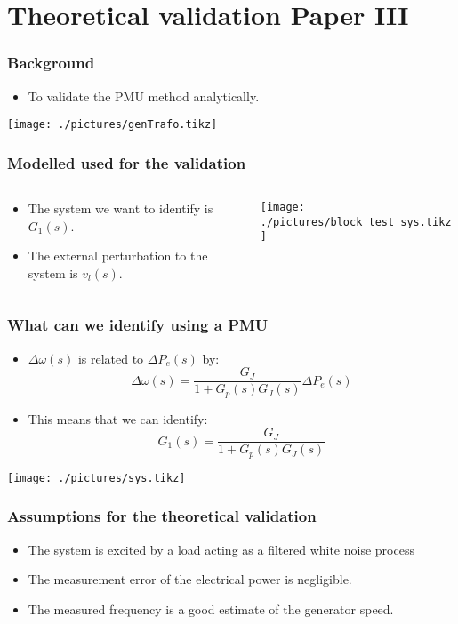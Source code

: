 \section{Theoretical validation Paper III}
\begin{frame}
	\frametitle{Background}
	\begin{itemize}
		\item To validate the PMU method analytically.
	\end{itemize}
	\texttt{[image: ./pictures/genTrafo.tikz]}
\end{frame}
\begin{frame}
	\frametitle{Modelled used for the validation}
	\begin{columns}
		\begin{column}{0.3\textwidth}
			\begin{itemize}
				\item The system we want to identify is $G_1(s)$.
				\item The external perturbation to the system is $v_l(s)$.
			\end{itemize}
		\end{column}
		\begin{column}{0.7\textwidth}
			\texttt{[image: ./pictures/block\_test\_sys.tikz]}
		\end{column}
	\end{columns}
\end{frame}
\begin{frame}
	\frametitle{What can we identify using a PMU}
	\begin{itemize}
		\item $\Delta \omega(s)$ is related to $\Delta P_e(s)$ by:
	\begin{equation*}
		\Delta \omega(s) = \frac{G_{J}}{1+G_p(s)G_J(s)}\Delta P_e(s)
	\end{equation*}
	\item This means that we can identify:
		\begin{equation*}
			G_1(s) = \frac{G_{J}}{1+G_p(s)G_J(s)}
		\end{equation*}
	\end{itemize}
		\texttt{[image: ./pictures/sys.tikz]}
\end{frame}
\begin{frame}
	\frametitle{Assumptions for the theoretical validation}
		\begin{itemize}
			\item The system is excited by a load acting as a filtered white noise process
			\item The measurement error of the electrical power is negligible.
			\item The measured frequency is a good estimate of the generator speed.
		\end{itemize}
\end{frame}
